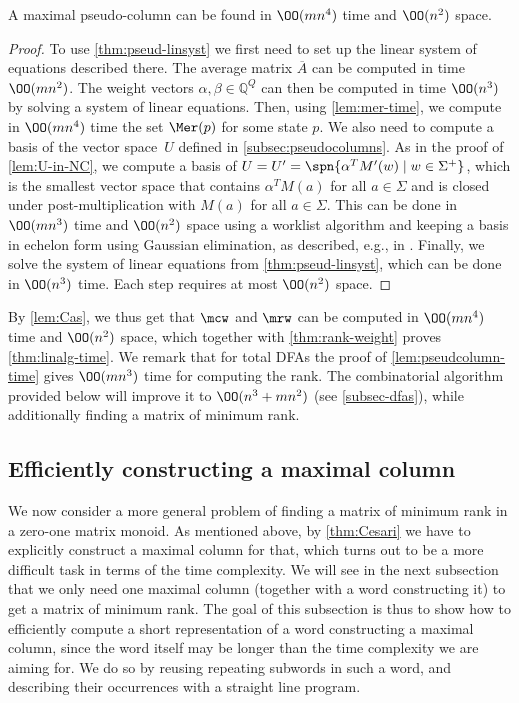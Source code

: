 \begin{lem}\label{lem:pseudcolumn-time}
    A maximal pseudo-column can be found in $\OO(mn^4)$ time and $\OO(n^2)$ space.
\end{lem}
\begin{proof}
To use \autoref{thm:pseud-linsyst} we first need to set up the linear system of equations described there.
The average matrix $\overline{A}$ can be computed in time $\OO(m n^2)$.
The weight vectors $\alpha, \beta \in \mathbb{Q}^Q$ can then be computed in time $\OO(n^3)$ by solving a system of linear equations.
Then, using \autoref{lem:mer-time},
we compute in $\OO(mn^4)$ time the set $\Mer(p)$ for some state $p$.
We also need to compute a basis of the vector space~$U$ defined in \autoref{subsec:pseudocolumns}.
As in the proof of \autoref{lem:U-in-NC}, we compute a basis of $U = U' = \spn{\alpha^T M'(w) \mid w \in \Sigma^+}$, which is the smallest vector space that contains $\alpha^T M(a)$ for all $a \in \Sigma$ and is closed under post-multiplication with $M(a)$ for all $a \in \Sigma$.
This can be done in $\OO(mn^3)$ time and $\OO(n^2)$ space using a worklist algorithm and keeping a basis in echelon form using Gaussian elimination, as described, e.g., in \cite[Section 2]{KieferWeighted20}.
Finally, we solve the system of linear equations from \autoref{thm:pseud-linsyst}, 
which can be done in $\OO(n^3)$ time.
Each step requires at most $\OO(n^2)$ space.
\end{proof}

\noindent
By \autoref{lem:Cas}, we thus get that $\mcw$ and $\mrw$ can be computed in  $\OO(mn^4)$ time and $\OO(n^2)$ space, which together with \autoref{thm:rank-weight} proves \autoref{thm:linalg-time}. 
We remark that for total DFAs the proof of \autoref{lem:pseudcolumn-time} gives $\OO(mn^3)$ time for computing the rank. The combinatorial algorithm provided below will improve it to $\OO(n^3 + mn^2)$ (see \autoref{subsec-dfas}), while additionally finding a matrix of minimum rank.


\subsection{Efficiently constructing a maximal column}\label{subsec:max-col} 

We now consider a more general problem of finding a matrix of minimum rank in a zero-one matrix monoid. As mentioned above, by \autoref{thm:Cesari} we have to explicitly construct a maximal column for that, which turns out to be a more difficult task in terms of the time complexity. We will see in the next subsection that we only need one maximal column (together with a word constructing it) to get a matrix of minimum rank.
The goal of this subsection is thus to show how to efficiently compute a short representation of a word constructing a maximal column, since the word itself may be longer than the time complexity we are aiming for. We do so by reusing repeating subwords in such a word, and describing their occurrences with a straight line program.

